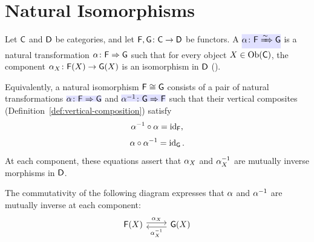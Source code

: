 \documentclass[../preamble]{subfiles}
\begin{document}
\section{Natural Isomorphisms}
\label{sec:natural-isomorphism}

Let $\mathsf{C}$ and $\mathsf{D}$ be categories,
and let $\Functor{F}, \Functor{G} \colon \Category{C} \lto \Category{D}$ be functors.
A 
$\newmath{\NatTrans{\alpha} \colon \Functor{F} \xRightarrow{\sim} \Functor{G}}$
is a natural transformation $\mathsf{\alpha} \colon \mathsf{F} \Rightarrow \mathsf{G}$
such that for every object $X \in \operatorname{Ob}(\mathsf{C})$,
the component $\NatTrans{\alpha}_X \colon \Functor{F}(X) \lto \Functor{G}(X)$
is an isomorphism in $\mathsf{D}$
().

\begin{definition}
  \label{def:nat-iso-componentwise}
  Equivalently,
  a natural isomorphism $\mathsf{F} \cong \mathsf{G}$
  consists of a pair of natural transformations
  $\newmath{\NatTrans{\alpha} \colon \Functor{F} \Rightarrow \Functor{G}}$
  and
  $\newmath{\NatTrans{\alpha}^{-1} \colon \Functor{G} \Rightarrow \Functor{F}}$
  such that their vertical composites
  (Definition~\ref{def:vertical-composition})
  satisfy
  \begin{equation}
    \label{eq:nat-iso-left}
    \mathsf{\alpha}^{-1} \circ \mathsf{\alpha} = \operatorname{id}_{\mathsf{F}},
  \end{equation}
  \begin{equation}
    \label{eq:nat-iso-right}
    \mathsf{\alpha} \circ \mathsf{\alpha}^{-1} = \operatorname{id}_{\mathsf{G}}.
  \end{equation}
  At each component,
  these equations assert that $\mathsf{\alpha}_X$ and $\mathsf{\alpha}^{-1}_X$
  are mutually inverse morphisms in $\mathsf{D}$.
\end{definition}

The commutativity of the following diagram expresses
that $\mathsf{\alpha}$ and $\mathsf{\alpha}^{-1}$
are mutually inverse at each component:
\begin{equation}
  \label{eq:nat-iso-roundtrip}
  \begin{tikzcd}
    \Functor{F}(X) \arrow[r, "\NatTrans{\alpha}_X", shift left]
      & \Functor{G}(X) \arrow[l, "\NatTrans{\alpha}^{-1}_X", shift left]
  \end{tikzcd}
\end{equation}
\end{document}
